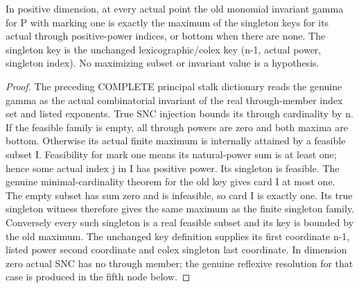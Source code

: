 \begin{lemma}
\label{hir:nc-ordered-tail-gamma-singleton-formula}
\leanok
In positive dimension, at every actual point the old monomial invariant gamma for P with marking
one is exactly the maximum of the singleton keys for its actual through
positive-power indices, or bottom when there are none. The singleton key is
the unchanged lexicographic/colex key (n-1, actual power, singleton index).
No maximizing subset or invariant value is a hypothesis.
\end{lemma}
\begin{proof}
The preceding COMPLETE principal stalk dictionary reads the genuine gamma
as the actual combinatorial invariant of the real through-member index set
and listed exponents. True SNC injection bounds its through cardinality by
n. If the feasible family is empty, all through powers are zero and both
maxima are bottom. Otherwise its actual finite maximum is internally attained
by a feasible subset I. Feasibility for mark one means its natural-power sum
is at least one; hence some actual index j in I has positive power. Its
singleton is feasible. The genuine minimal-cardinality theorem for the old
key gives card I at most one. The empty subset has sum zero and is infeasible,
so card I is exactly one. Its true singleton witness therefore gives the
same maximum as the finite singleton family. Conversely every such singleton
is a real feasible subset and its key is bounded by the old maximum. The
unchanged key definition supplies its first coordinate n-1, listed power
second coordinate and colex singleton last coordinate. In dimension zero actual SNC has no through member; the genuine reflexive
resolution for that case is produced in the fifth node below.
\end{proof}

